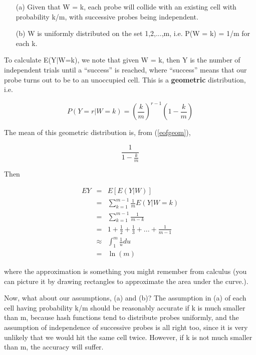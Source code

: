 \documentclass[11pt]{article}
\begin{document}
\begin{itemize}

\item [(a)] Given that W = k, each probe will collide with an existing
cell with probability k/m, with successive probes being independent.

\item [(b)] W is uniformly distributed on the set 1,2,...,m, i.e. P(W =
k) = 1/m for each k.

\end{itemize}

To calculate E(Y$|$W=k), we note that given W = k, then Y is the
number of independent trials until a ``success'' is reached, where
``success'' means that our probe turns out to be to an unoccupied cell.
This is a {\bf geometric} distribution, i.e.

\begin{equation}
P(Y = r | W = k) = {(\frac{k}{m})}^{r-1} (1-\frac{k}{m})
\end{equation}

The mean of this geometric distribution is, from (\ref{eofgeom}),

\begin{equation} 
\frac{1}{1-\frac{k}{m}}
\end{equation}

Then 

\begin{eqnarray}
EY & = & E[E(Y|W)]\\
 & = & \sum ^{m-1}_{k=1}\frac{1}{m}E(Y|W=k)\\
 & = & \sum ^{m-1}_{k=1}\frac{1}{m-k}\\
 & = & 1+\frac{1}{2}+\frac{1}{3}+...+\frac{1}{m-1}\\
 & \approx  & \int_1^m \frac{1}{u} du \\
 & = & \ln(m)
\end{eqnarray}

where the approximation is something you might remember from calculus
(you can picture it by drawing rectangles to approximate the area under
the curve.).

Now, what about our assumptions, (a) and (b)?  The assumption in (a) of
each cell having probability k/m should be reasonably accurate if k is
much smaller than m, because hash functions tend to distribute probes
uniformly, and the assumption of independence of successive probes is
all right too, since it is very unlikely that we would hit the same cell
twice.  However, if k is not much smaller than m, the accuracy will
suffer.
\end{document}
